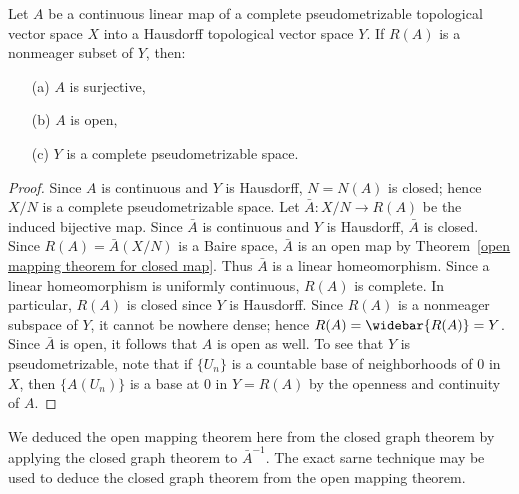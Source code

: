 \begin{theorem}\label{open mapping theorem for continuous map}
Let $A$ be a continuous linear map of a complete pseudometrizable topological vector space $X$ into a Hausdorff topological vector space $Y$. If $R(A)$ is a nonmeager subset of $Y$, then:
\begin{itemize}
\item[(a)] $A$ is surjective,
\item[(b)] $A$ is open,
\item[(c)] $Y$ is a complete pseudometrizable space.
\end{itemize}
\end{theorem}
\begin{proof}
Since $A$ is continuous and $Y$ is Hausdorff, $N=N(A)$ is closed; hence $X/N$ is a complete pseudometrizable space. Let $\bar{A}:X/N\to R(A)$ be the induced bijective map. Since $\bar{A}$ is continuous and $Y$ is Hausdorff, $\bar{A}$ is closed. Since $R(A)=\bar{A}(X/N)$ is a Baire space, $\bar{A}$ is an open map by Theorem~\ref{open mapping theorem for closed map}. Thus $\bar{A}$ is a linear homeomorphism. Since a linear homeomorphism is uniformly continuous, $R(A)$ is complete. In particular, $R(A)$ is closed since $Y$ is Hausdorff. Since $R(A)$ is a nonmeager subspace of $Y$, it cannot be nowhere dense; hence $R(A)=\widebar{R(A)}=Y$. Since $\bar{A}$ is open, it follows that $A$ is open as well. To see that $Y$ is pseudometrizable, note that if $\{U_n\}$ is a countable base of neighborhoods of $0$ in $X$, then $\{A(U_n)\}$ is a base at $0$ in $Y=R(A)$ by the openness and continuity of $A$.
\end{proof}
We deduced the open mapping theorem here from the closed graph theorem by applying the closed graph theorem to $\bar{A}^{-1}$. The exact sarne technique may be used to deduce the closed graph theorem from the
open mapping theorem.
